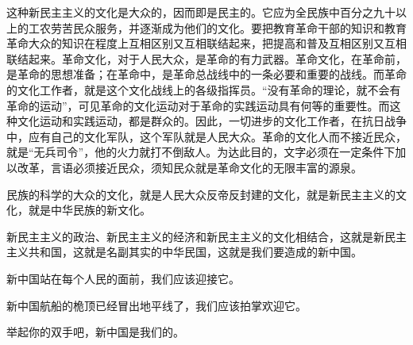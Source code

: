 这种新民主主义的文化是大众的，因而即是民主的。它应为全民族中百分之九十以上的工农劳苦民众服务，并逐渐成为他们的文化。要把教育革命干部的知识和教育革命大众的知识在程度上互相区别又互相联结起来，把提高和普及互相区别又互相联结起来。革命文化，对于人民大众，是革命的有力武器。革命文化，在革命前，是革命的思想准备；在革命中，是革命总战线中的一条必要和重要的战线。而革命的文化工作者，就是这个文化战线上的各级指挥员。“没有革命的理论，就不会有革命的运动”，可见革命的文化运动对于革命的实践运动具有何等的重要性。而这种文化运动和实践运动，都是群众的。因此，一切进步的文化工作者，在抗日战争中，应有自己的文化军队，这个军队就是人民大众。革命的文化人而不接近民众，就是“无兵司令”，他的火力就打不倒敌人。为达此目的，文字必须在一定条件下加以改革，言语必须接近民众，须知民众就是革命文化的无限丰富的源泉。

民族的科学的大众的文化，就是人民大众反帝反封建的文化，就是新民主主义的文化，就是中华民族的新文化。

新民主主义的政治、新民主主义的经济和新民主主义的文化相结合，这就是新民主主义共和国，这就是名副其实的中华民国，这就是我们要造成的新中国。

新中国站在每个人民的面前，我们应该迎接它。

新中国航船的桅顶已经冒出地平线了，我们应该拍掌欢迎它。

举起你的双手吧，新中国是我们的。


